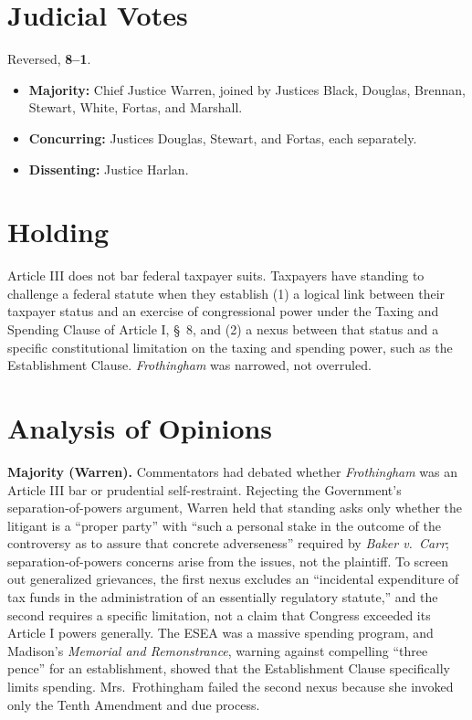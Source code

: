 \documentclass[12pt]{article}
\begin{document}
\section{Judicial Votes}

Reversed, \textbf{8--1}.
\begin{itemize}
\item \textbf{Majority:} Chief Justice Warren, joined by Justices Black, Douglas, Brennan, Stewart, White, Fortas, and Marshall.
\item \textbf{Concurring:} Justices Douglas, Stewart, and Fortas, each separately.
\item \textbf{Dissenting:} Justice Harlan.
\end{itemize}

\section{Holding}

Article III does not bar federal taxpayer suits. Taxpayers have standing to challenge a federal statute when they establish (1) a logical link between their taxpayer status and an exercise of congressional power under the Taxing and Spending Clause of Article I, \S\ 8, and (2) a nexus between that status and a specific constitutional limitation on the taxing and spending power, such as the Establishment Clause. \textit{Frothingham} was narrowed, not overruled.

\section{Analysis of Opinions}

\textbf{Majority (Warren).} Commentators had debated whether \textit{Frothingham} was an Article III bar or prudential self-restraint. Rejecting the Government's separation-of-powers argument, Warren held that standing asks only whether the litigant is a ``proper party'' with ``such a personal stake in the outcome of the controversy as to assure that concrete adverseness'' required by \textit{Baker v.\ Carr}; separation-of-powers concerns arise from the issues, not the plaintiff. To screen out generalized grievances, the first nexus excludes an ``incidental expenditure of tax funds in the administration of an essentially regulatory statute,'' and the second requires a specific limitation, not a claim that Congress exceeded its Article I powers generally. The ESEA was a massive spending program, and Madison's \textit{Memorial and Remonstrance}, warning against compelling ``three pence'' for an establishment, showed that the Establishment Clause specifically limits spending. Mrs.\ Frothingham failed the second nexus because she invoked only the Tenth Amendment and due process.
\end{document}
